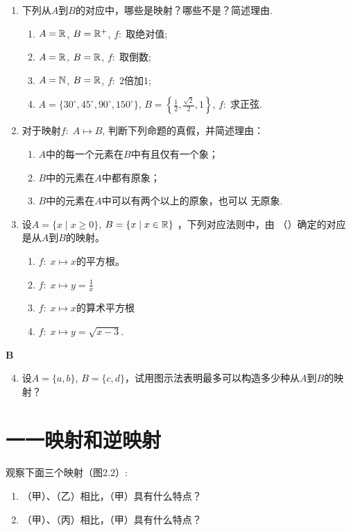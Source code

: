 \begin{enumerate}
    \item 下列从$A$到$B$的对应中，哪些是映射？哪些不是？简述理由.
\begin{enumerate}[(1)]
    \item $A=\mathbb{R}$, $B=\mathbb{R}^+$, $f:\;\text{取绝对值}$;
    \item $A=\mathbb{R}$, $B=\mathbb{R}$, $f:\;\text{取倒数}$;
    \item $A=\mathbb{N}$, $B=\mathbb{R}$, $f:\;\text{2倍加1}$;
    \item $A=\{30^{\circ},45^{\circ},90^{\circ},150^{\circ}\}$, $B=\left\{\frac{1}{2},\frac{\sqrt{2}}{2},1\right\}$, $f:\;\text{求正弦}$.
\end{enumerate}

\item 对于映射$f:\; A\mapsto  B$, 判断下列命题的真假，并简述理由：
\begin{enumerate}[(1)]
\item $A$中的每一个元素在$B$中有且仅有一个象；
\item $B$中的元素在$A$中都有原象；
\item $B$中的元素在$A$中可以有两个以上的原象，也可以
无原象.
\end{enumerate}

\item 设$A=\{x\mid x\ge 0\}$, $B=\{x\mid x\in\mathbb{R}\}$
，下列对应法则中，由
（\quad ）确定的对应是从$A$到$B$的映射。
\begin{enumerate}[(1)]
    \item $f:\; x\mapsto  x$的平方根。
\item $f:\; x\mapsto  y=\frac{1}{x}$
\item $f:\; x\mapsto  x\text{的算术平方根}$
\item $f:\; x\mapsto  y=\sqrt{x-3}$.
\end{enumerate}
\end{enumerate}

\begin{center}
    \bfseries B
\end{center}

\begin{enumerate}\setcounter{enumi}{3}
    \item 设$A=\{a,b\}$, $B=\{c,d\}$，试用图示法表明最多可以构造多少种从$A$到$B$的映射？
\end{enumerate}

\section{一一映射和逆映射}
观察下面三个映射（图2.2）:
\begin{enumerate}[(1)]
\item （甲）、（乙）相比，（甲）具有什么特点？
\item （甲）、（丙）相比，（甲）具有什么特点？
\end{enumerate}

